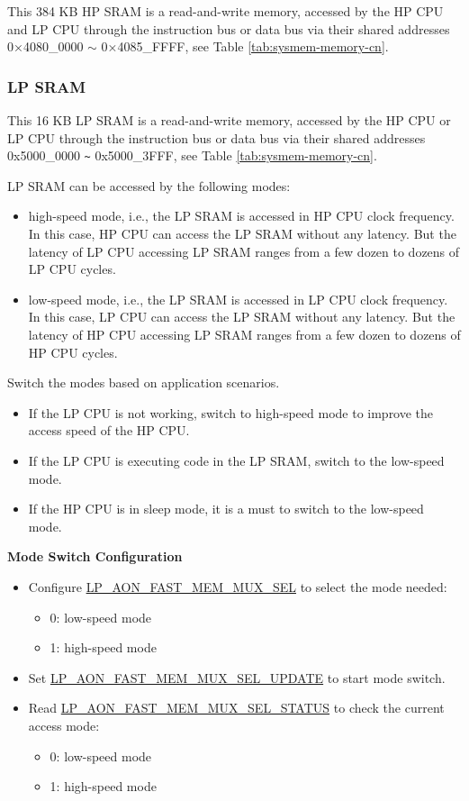 \documentclass[main\_\_EN.tex]{subfiles}
\begin{document}
This 384 KB HP SRAM is a read-and-write memory, accessed by the HP CPU and LP CPU through the instruction bus or data bus via their shared addresses 0×4080\_0000 $\sim$ 0×4085\_FFFF, see Table  \ref{tab:sysmem-memory-cn}. 


\subsubsection{LP SRAM}

This 16 KB LP SRAM is a read-and-write memory, accessed by the HP CPU or LP CPU through the instruction bus or data bus via their shared addresses 0x5000\_0000 \verb+~+ 0x5000\_3FFF, see Table  \ref{tab:sysmem-memory-cn}.

LP SRAM can be accessed by the following modes:
\begin{itemize}
    \item high-speed mode, i.e., the LP SRAM is accessed in HP CPU clock frequency. In this case, HP CPU can access the LP SRAM without any latency. But the latency of LP CPU accessing LP SRAM ranges from a few dozen to dozens of LP CPU cycles.
    \item low-speed mode, i.e., the LP SRAM is accessed in LP CPU clock frequency. In this case, LP CPU can access the LP SRAM without any latency. But the latency of HP CPU accessing LP SRAM ranges from a few dozen to dozens of HP CPU cycles.
\end{itemize}

Switch the modes based on application scenarios.
\begin{itemize}
    \item If the LP CPU is not working, switch to high-speed mode to improve the access speed of the HP CPU.
    \item If the LP CPU is executing code in the LP SRAM, switch to the low-speed mode.
    \item If the HP CPU is in sleep mode, it is a must to switch to the low-speed mode.
\end{itemize}

\textbf{Mode Switch Configuration}
\begin{itemize}
    \item Configure  \hyperref[fielddesc:LPAONFASTMEMMUXSEL]{LP\_AON\_FAST\_MEM\_MUX\_SEL} to select the mode needed:
    \begin{itemize}
        \item 0: low-speed mode
        \item 1: high-speed mode
    \end{itemize}
    \item Set  \hyperref[fielddesc:LPAONFASTMEMMUXSELUPDATE]{LP\_AON\_FAST\_MEM\_MUX\_SEL\_UPDATE} to start mode switch.
    \item Read  \hyperref[fielddesc:LPAONFASTMEMMUXSELSTATUS]{LP\_AON\_FAST\_MEM\_MUX\_SEL\_STATUS} to check the current access mode:
    \begin{itemize}
        \item 0: low-speed mode
        \item 1: high-speed mode
    \end{itemize}
\end{itemize}
\end{document}
